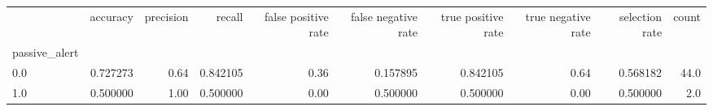 \begin{tabular}{lrrrrrrrrr}
\toprule
{} &  accuracy &  precision &    recall &  false positive rate &  false negative rate &  true positive rate &  true negative rate &  selection rate &  count \\
passive\_alert &           &            &           &                      &                      &                     &                     &                 &        \\
\midrule
0.0           &  0.727273 &       0.64 &  0.842105 &                 0.36 &             0.157895 &            0.842105 &                0.64 &        0.568182 &   44.0 \\
1.0           &  0.500000 &       1.00 &  0.500000 &                 0.00 &             0.500000 &            0.500000 &                0.00 &        0.500000 &    2.0 \\
\bottomrule
\end{tabular}
